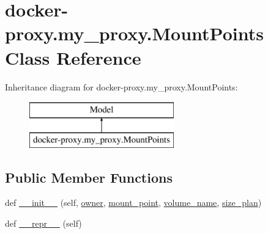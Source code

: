 \hypertarget{classdocker-proxy_1_1my__proxy_1_1_mount_points}{}\section{docker-\/proxy.my\+\_\+proxy.\+Mount\+Points Class Reference}
\label{classdocker-proxy_1_1my__proxy_1_1_mount_points}
Inheritance diagram for docker-\/proxy.my\+\_\+proxy.\+Mount\+Points\+:\begin{figure}[H]
\begin{center}
\leavevmode
\includegraphics[height=2.000000cm]{classdocker-proxy_1_1my__proxy_1_1_mount_points}
\end{center}
\end{figure}
\subsection*{Public Member Functions}
\begin{DoxyCompactItemize}
\item 
def \hyperlink{classdocker-proxy_1_1my__proxy_1_1_mount_points_a559b6a122b5406dda695f40dc5eda8e9}{\+\_\+\+\_\+init\+\_\+\+\_\+} (self, \hyperlink{classdocker-proxy_1_1my__proxy_1_1_mount_points_aa49cde7530c0edaec96a4407707e714d}{owner}, \hyperlink{classdocker-proxy_1_1my__proxy_1_1_mount_points_aa7cfbe6eb066a60a4b6a0399fc64e003}{mount\+\_\+point}, \hyperlink{classdocker-proxy_1_1my__proxy_1_1_mount_points_aec1c878c659bd308f99b529d397d85c7}{volume\+\_\+name}, \hyperlink{classdocker-proxy_1_1my__proxy_1_1_mount_points_a6008b3f58ac2dd027f1d637cc84ee78c}{size\+\_\+plan})
\item 
def \hyperlink{classdocker-proxy_1_1my__proxy_1_1_mount_points_aea56d9596b2864b4d089b0f34744f3f4}{\+\_\+\+\_\+repr\+\_\+\+\_\+} (self)
\end{DoxyCompactItemize}
